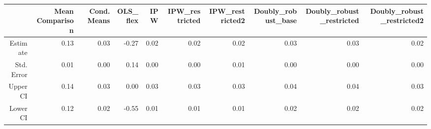 \begin{table}[ht]
\centering
\begin{tabular}{rrrrrrrrrr}
  \hline
 & Mean Comparison & Cond. Means & OLS\_flex & IPW & IPW\_restricted & IPW\_restricted2 & Doubly\_robust\_base & Doubly\_robust\_restricted & Doubly\_robust\_restricted2 \\ 
  \hline
Estimate & 0.13 & 0.03 & -0.27 & 0.02 & 0.02 & 0.02 & 0.03 & 0.03 & 0.02 \\ 
  Std. Error & 0.01 & 0.00 & 0.14 & 0.00 & 0.00 & 0.01 & 0.00 & 0.00 & 0.00 \\ 
  Upper CI & 0.14 & 0.03 & 0.00 & 0.03 & 0.03 & 0.03 & 0.04 & 0.04 & 0.03 \\ 
  Lower CI & 0.12 & 0.02 & -0.55 & 0.01 & 0.01 & 0.01 & 0.02 & 0.02 & 0.02 \\ 
   \hline
\end{tabular}
\end{table}
